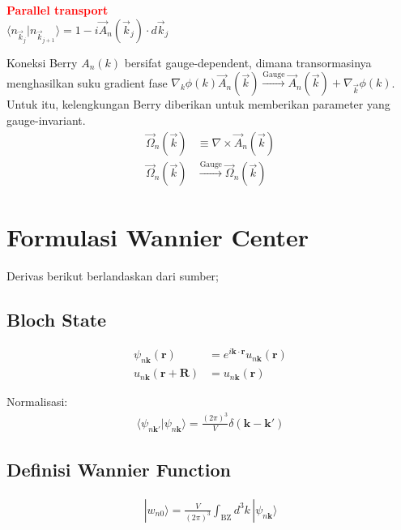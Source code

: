 \begin{center}
    \textcolor{red}{\textbf{Parallel transport}} \\
    \colorbox{yellow!20}{
        $\displaystyle \langle n_{\vec{k}_j} | n_{\vec{k}_{j+1}} \rangle = 1 - i \vec{A}_n(\vec{k}_j) \cdot d\vec{k}_j$
    }
\end{center}
\par 
Koneksi Berry $A_n(k)$ bersifat gauge-dependent, dimana transormasinya menghasilkan suku gradient fase $\nabla_k \phi (k)$$\vec{A}_n(\vec{k}) \xrightarrow{\text{Gauge}} \vec{A}_n(\vec{k}) + \nabla_{\vec{k}} \phi(k)$. Untuk itu, kelengkungan Berry diberikan untuk memberikan parameter yang gauge-invariant.
\begin{align*}
\vec{\Omega}_n(\vec{k}) &\equiv \nabla \times \vec{A}_n(\vec{k}) \\
\vec{\Omega}_n(\vec{k}) &\xrightarrow{\text{Gauge}} \vec{\Omega}_n(\vec{k})
\end{align*}

\section{Formulasi Wannier Center}
Derivas berikut berlandaskan dari sumber; \parencite{vanderbilt2021theory} \parencite{Vanderbilt2018}
\subsection*{Bloch State}

\begin{align}
\psi_{n\mathbf{k}}(\mathbf{r})
&=
e^{i\mathbf{k}\cdot\mathbf{r}}
u_{n\mathbf{k}}(\mathbf{r}) \\
u_{n\mathbf{k}}(\mathbf{r}+\mathbf{R})
&=
u_{n\mathbf{k}}(\mathbf{r})
\end{align}

Normalisasi:
\begin{align}
\langle \psi_{n\mathbf{k}'} | \psi_{n\mathbf{k}} \rangle
=
\frac{(2\pi)^3}{V}
\delta(\mathbf{k}-\mathbf{k}')
\end{align}

\subsection*{Definisi Wannier Function}

\begin{align}
| w_{n0} \rangle
=
\frac{V}{(2\pi)^3}
\int_{\text{BZ}} d^3k \,
| \psi_{n\mathbf{k}} \rangle
\end{align}

